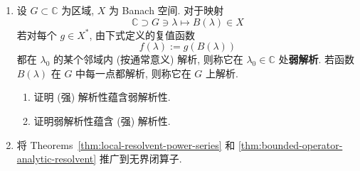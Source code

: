 \begin{enumerate}[label=\thesection.\arabic*.,ref=\thesection.\arabic*,start=17,series=book-problems]
\item\label{ex:weak-and-strong-banach-valued-analyticity} 设 $G\subset\mathbb{C}$ 为区域, $X$ 为 Banach 空间. 对于映射
\begin{equation}\label{eq:weakly-analytic-banach-valued-map}
\mathbb{C}\supset G\ni\lambda\mapsto B(\lambda)\in X
\end{equation}
若对每个 $g\in X^*$, 由下式定义的复值函数
\begin{equation}\label{eq:weakly-analytic-scalar-functional-composition}
f(\lambda):=g(B(\lambda))
\end{equation}
都在 $\lambda_0$ 的某个邻域内 (按通常意义) 解析, 则称它在 $\lambda_0\in\mathbb{C}$ 处\textbf{弱解析}. 若函数 $B(\lambda)$ 在 $G$ 中每一点都解析, 则称它在 $G$ 上解析.\begin{enumerate}[label=(\alph*)]\item 证明 (强) 解析性蕴含弱解析性.\item 证明弱解析性蕴含 (强) 解析性.\end{enumerate}

\item\label{ex:closed-unbounded-resolvent-analyticity} 将 Theorems~\ref{thm:local-resolvent-power-series} 和 \ref{thm:bounded-operator-analytic-resolvent} 推广到无界闭算子.

\end{enumerate}
